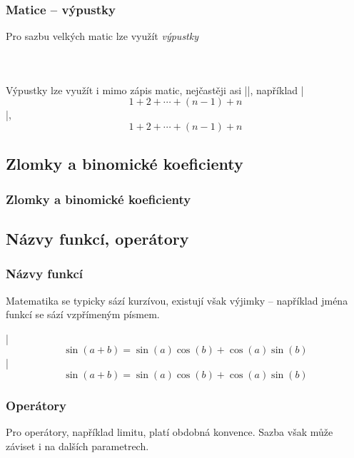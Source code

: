 \begin{frame}[fragile]
	\frametitle{Matice -- výpustky}
	Pro sazbu velkých matic lze využít \emph{výpustky}\par\bigskip
	\begin{columns}
		\begin{column}{0.4\textwidth}
			\begin{displaymath}
				
			\end{displaymath}
		\end{column}
		\begin{column}{0.6\textwidth}
		\end{column}
	\end{columns}
	\begin{remark}
		Výpustky lze využít i mimo zápis matic, nejčastěji asi |\cdots|, například |$$1 + 2 + \cdots + (n-1) + n$$|, $$1 + 2 + \cdots + (n-1) + n$$
	\end{remark}
\end{frame}


\subsection{Zlomky a binomické koeficienty}
\begin{frame}
	\frametitle{Zlomky a binomické koeficienty}
\end{frame}


\subsection{Názvy funkcí, operátory}
\begin{frame}[fragile]
	\frametitle{Názvy funkcí}
	Matematika se typicky sází kurzívou, existují však výjimky -- například jména funkcí se sází vzpřímeným písmem.\par
	|$$\sin(a + b) = \sin(a)\cos(b) + \cos(a)\sin(b)$$|
	$$\sin(a + b) = \sin(a)\cos(b) + \cos(a)\sin(b)$$
\end{frame}


\begin{frame}[fragile]
	\frametitle{Operátory}
	Pro operátory, například limitu, platí obdobná konvence. Sazba však může záviset i na dalších parametrech.
	\par\bigskip
	\par\bigskip
	
\end{frame}


